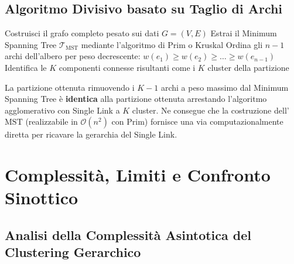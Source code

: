 \FloatBarrier
\subsection{Algoritmo Divisivo basato su Taglio di Archi}

\begin{algorithm}[htbp]
\SetAlgoLined
{}
Costruisci il grafo completo pesato sui dati $G = (V, E)$\;
Estrai il Minimum Spanning Tree $\mathcal{T}_{\mathrm{MST}}$ mediante l'algoritmo di Prim o Kruskal\;
Ordina gli $n - 1$ archi dell'albero per peso decrescente: $w(e_1) \ge w(e_2) \ge \dots \ge w(e_{n-1})$\;
Identifica le $K$ componenti connesse risultanti come i $K$ cluster della partizione\;
\caption{Clustering divisivo basato su Minimum Spanning Tree.}
\label{alg:dm-divisive-mst}
\end{algorithm}

\begin{property}
La partizione ottenuta rimuovendo i $K - 1$ archi a peso massimo dal Minimum Spanning Tree è \textbf{identica} alla partizione ottenuta arrestando l'algoritmo agglomerativo con Single Link a $K$ cluster. Ne consegue che la costruzione dell'$\mathrm{MST}$ (realizzabile in $\mathcal{O}(n^2)$ con Prim) fornisce una via computazionalmente diretta per ricavare la gerarchia del Single Link.
\end{property}

\FloatBarrier
\section{Complessità, Limiti e Confronto Sinottico}
\label{sec:dm-hierarchical-complexity-comparison}

\FloatBarrier
\subsection{Analisi della Complessità Asintotica del Clustering Gerarchico}

